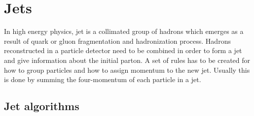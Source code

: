 
\section{Jets}

In high energy physics, jet is a collimated group of hadrons which emerges as a result of quark or gluon fragmentation and hadronization process. Hadrons reconstructed in a particle detector need to be combined in order to form a jet and give information about the initial parton. A set of rules has to be created for how to group particles and how to assign momentum to the new jet. Usually this is done by summing the four-momentum of each particle in a jet.


\subsection{Jet algorithms}

